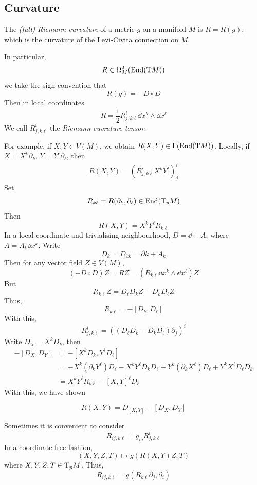 \documentclass{article}
\begin{document}
\subsection{Curvature}

\begin{definition}
    The \emph{(full) Riemann curvature} of a metric \(g\) on a manifold \(M\) is \(R = R(g)\), which is the curvature of the Levi-Civita connection on \(M\).
\end{definition}

In particular,
\[R \in \Omega^2_M(\operatorname{End}(\mathrm{T} M))\]
we take the sign convention that
\[R(g) = -D \circ D\]
Then in local coordinates
\[R = \frac{1}{2}R^i_{j,k\ell}\dd x^k \wedge \dd x^\ell\]
We call \(R^i_{j,k\ell}\) the \emph{Riemann cuvrature tensor}.

For example, if \(X, Y \in V(M)\), we obtain \(R(X, Y) \in \Gamma(\operatorname{End}(\mathrm{T} M))\). Locally, if \(X = X^k\partial_k\), \(Y = Y^\ell\partial_\ell\), then
\begin{align*}
    R(X, Y) = \left(R^i_{j,k\ell}X^kY^\ell\right)^i_j
\end{align*}
Set
\[R_{k\ell} = R(\partial_k, \partial_\ell) \in \operatorname{End}(\mathrm{T}_p M)\]
Then
\[R(X, Y) = X^kY^\ell R_{k\ell}\]
In a local coordinate and trivialising neighbourhood, \(D = \dd + A\), where \(A = A_k\dd x^k\). Write
\[D_k = D_{\partial k} = \partial k + A_k\]
Then for any vector field \(Z \in V(M)\),
\[(-D \circ D)Z = RZ = (R_{k\ell} \dd x^k\wedge \dd x^\ell)Z\]
But
\[R_{k\ell}Z = D_\ell D_kZ - D_kD_\ell Z\]
Thus,
\[R_{k\ell} = -[D_k, D_\ell]\]
With this,
\[R^i_{j, k\ell} = \left((D_\ell D_k - D_kD_\ell)\partial_j\right)^i\]
Write \(D_X = X^kD_k\), then
\begin{align*}
    -[D_X, D_Y] &= -[X^kD_k, Y^\ell D_\ell] \\
    &= -X^k(\partial_kY^\ell)D_\ell - X^kY^\ell D_kD_\ell + Y^k(\partial_k X^\ell)D_\ell + Y^kX^\ell D_\ell D_k \\
    &= X^kY^\ell R_{k\ell} - [X, Y]^\ell D_\ell 
\end{align*}
With this, we have shown
\begin{lemma}
    \[R(X, Y) = D_{[X, Y]} - [D_X, D_Y]\]
\end{lemma}

\lec

Sometimes it is convenient to consider
\[R_{ij,k\ell} = g_{iq}R^i_{j,k\ell}\]
In a coordinate free fashion,
\[(X, Y, Z, T) \mapsto g(R(X, Y)Z, T)\]
where \(X, Y, Z, T \in \mathrm{T}_pM\).
Thus,
\[R_{ij, k\ell} = g\left(R_{k\ell}\partial_j, \partial_i\right)\]
\end{document}
